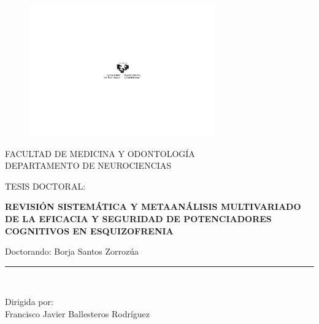 \documentclass[a4paper,openright,12pt]{report}
\begin{document}

\begin{titlepage}

\begin{center}
\vspace*{-1in}
\begin{figure}[htb]
\begin{center}
\includegraphics[width=8cm]{Logotipo_completo}
\end{center}
\end{figure}
\vspace*{0.6in}
FACULTAD DE MEDICINA Y ODONTOLOGÍA\\
\vspace*{0.15in}
DEPARTAMENTO DE NEUROCIENCIAS \\
\vspace*{0.6in}
\begin{large}
TESIS DOCTORAL:\\
\end{large}
\vspace*{0.2in}
\begin{Large}
\textbf{REVISIÓN SISTEMÁTICA Y METAANÁLISIS MULTIVARIADO DE LA EFICACIA Y SEGURIDAD DE POTENCIADORES
COGNITIVOS EN ESQUIZOFRENIA} \\
\end{Large}
\vspace*{0.3in}
\begin{large}
Doctorando: Borja Santos Zorrozúa\\
\end{large}
\vspace*{0.3in}
\rule{80mm}{0.1mm}\\
\vspace*{0.1in}
\begin{large}
Dirigida por: \\
Francisco Javier Ballesteros Rodríguez \\
\end{large}
\end{center}

\end{titlepage}
\end{document}
